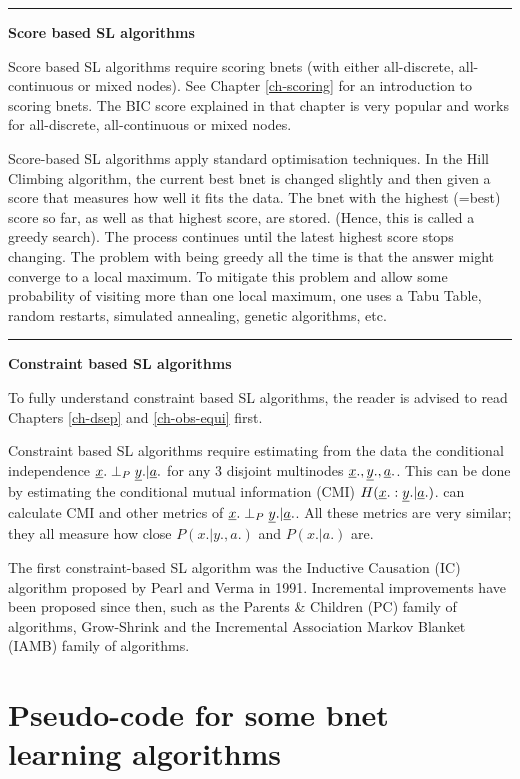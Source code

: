 \hrule\noindent
{\bf Score based SL algorithms}

Score based SL algorithms
require
scoring bnets (with either
all-discrete, all-continuous
or mixed nodes).
See Chapter \ref{ch-scoring}
for an introduction
to scoring bnets.
The BIC score
explained
in that chapter is
very popular
and works for all-discrete,
all-continuous or mixed nodes.

Score-based SL algorithms apply
standard
optimisation techniques. 
In the Hill Climbing algorithm,
the current best
bnet is changed
slightly
and then given a score
that measures how well
it fits the data.
The bnet with the highest (=best) 
score so far, as well as that highest score,
are stored. (Hence,
this is called a greedy search).
The process continues
until the latest highest score stops changing.
The problem with being
greedy all the time is that
the answer might
converge to a local maximum.
To mitigate
this problem
and allow some
probability of visiting more
than one
local maximum, one uses a
Tabu Table, random restarts,
simulated annealing, genetic algorithms,
etc.

\hrule\noindent
{\bf Constraint based SL algorithms}

To fully understand
 constraint based SL 
algorithms,
the reader 
is advised to read Chapters 
\ref{ch-dsep} and \ref{ch-obs-equi}
first.

Constraint based SL algorithms
require
estimating from the data
the conditional independence
${\underline{x}}.\perp_P {\underline{y}}.|{\underline{a}}.$ 
for any 3 disjoint
multinodes ${\underline{x}}., {\underline{y}}., {\underline{a}}.$.
This can be done by
estimating the conditional
mutual information (CMI)
$H({\underline{x}}.:{\underline{y}}.|{\underline{a}}.)$.
\bnlearn  can calculate CMI and
other metrics
of ${\underline{x}}.\perp_P {\underline{y}}.|{\underline{a}}.$.
All these metrics are very
similar; they 
all measure
how close
$P(x.|y., a.)$
and $P(x.|a.)$ are.

The first
constraint-based SL algorithm
was the Inductive Causation (IC) algorithm
 proposed by Pearl and Verma in 1991.
Incremental
improvements
have been
proposed since then, such as
the Parents \& Children (PC) family
of algorithms,
Grow-Shrink and
the
Incremental Association Markov Blanket (IAMB)
family of algorithms.

\newpage
\section*{Pseudo-code 
for some bnet learning algorithms}






